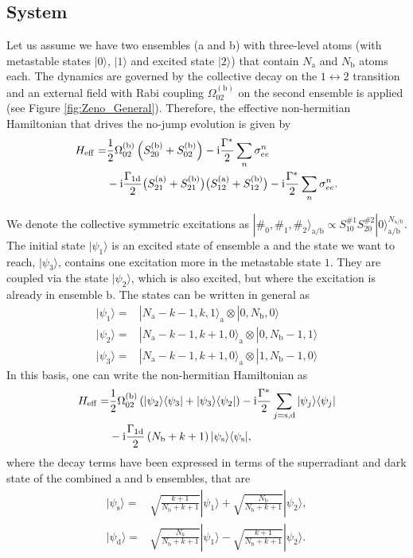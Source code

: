\documentclass[twocolumn,pra,aps,superscriptaddress,showpacs]{revtex4-1}
\newcommand{\ket}[1]{|#1\rangle}
\newcommand{\bra}[1]{\langle #1|}
\def\oned{\mathrm{1d}}
\def\ii{\mathord{\rm i}}
\newcommand{\rs}{\mathrm{s}}
\newcommand{\rd}{\mathrm{d}}
\renewcommand{\aa}{\mathrm{a}}
\newcommand{\bb}{\mathrm{b}}
\begin{document}
\subsection{System}

Let us assume we have two ensembles (a and b) with three-level atoms (with metastable states $\ket{0}$, $\ket{1}$ and excited state $\ket{2}$) that contain $N_\aa$ and $N_\bb$ atoms each. The dynamics are governed by the collective decay on the $1 \leftrightarrow 2$ transition and an external field with Rabi coupling $\Omega_{02}^{(\bb)}$ on the second ensemble is applied (see Figure \ref{fig:Zeno_General}). Therefore, the effective non-hermitian Hamiltonian that drives the no-jump evolution is given by
\begin{align}
H_\mathrm{eff} =& 
	\frac{1}{2} \Omega_{02}^{(\bb)}  \left( S_{20}^{(\bb)} + S_{02}^{(\bb)} \right)  -\mathrm{i} \frac{\Gamma^*}{2}\sum_{n}\sigma^{n}_{ee}
	\nonumber \\
	&-\mathrm{i} \frac{\Gamma_\oned}{2}
	\big(S_{21}^{(\aa)} + S_{21}^{(\bb)} \big) \big(S_{12}^{(\aa)} + S_{12}^{(\bb)} \big)
	-\mathrm{i} \frac{\Gamma^*}{2}\sum_{n}\sigma^{n}_{ee}. \notag
\end{align}

We denote the collective symmetric excitations as $\ket{\#_0, \#_1, \#_2}_{\aa/\bb} \propto S_{10}^ {\#1} S_{20}^ {\#2} \ket{0}_{\aa/\bb}^{N_{\aa/\bb}}$. The initial state  $\ket{\psi_1}$ is an excited state of ensemble $\aa$ and the state we want to reach, $\ket{\psi_3}$, contains one excitation more in the metastable state $1$. They are coupled via the state $\ket{\psi_2}$, which is also excited, but where the excitation is already in ensemble $\bb$. The states can be written in general as
\begin{align}
\ket{\psi_1}
	 =& \ket{N_\aa - k - 1, k, 1}_\aa \otimes \ket{0, N_\bb, 0} \\
\ket{\psi_2} 
	=& \ket{N_\aa - k - 1, k+1, 0}_\aa \otimes \ket{0, N_\bb-1, 1} \\
\ket{\psi_3} 
	=& \ket{N_\aa - k - 1, k+1, 0}_\aa \otimes \ket{1, N_\bb-1, 0}
\end{align}
In this basis, one can write the non-hermitian Hamiltonian as
%
\begin{align}
H_\mathrm{eff} 
	=& \frac{1}{2} \Omega_{02}^{(\bb)} 
		\left( \ket{\psi_2} \bra{\psi_3} + \ket{\psi_3} \bra{\psi_2}\right)  
		- \ii \frac{\Gamma^*}{2} \sum_{j = \rs, \rd} \ket{\psi_j} \bra{\psi_j} \notag \\
	& - \ii \frac{\Gamma_\oned}{2} \left(N_\bb + k + 1 \right) \ket{\psi_\rs} \bra{\psi_\rs},
\end{align}
where the decay terms have been expressed in terms of the superradiant and dark state of the combined $\aa$ and $\bb$ ensembles, that are
\begin{align}
\ket{\psi_\rs} 
	=& \sqrt{\frac{k+1}{N_\bb + k+1}} \ket{\psi_1} 
		+ \sqrt{\frac{N_\bb}{N_\bb + k+1}} \ket{\psi_2}, \\
\ket{\psi_\rd} 
	=& \sqrt{\frac{N_b}{N_\bb + k+1}} \ket{\psi_1} 
		- \sqrt{\frac{k+1}{N_\bb + k+1}} \ket{\psi_2}.
\end{align}
\end{document}
